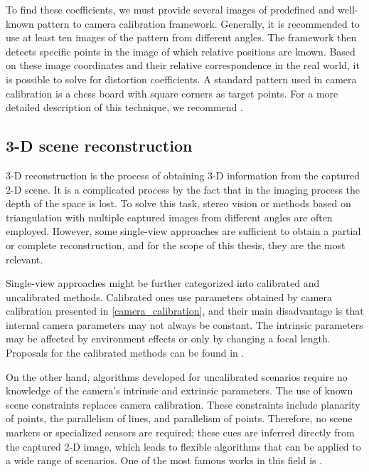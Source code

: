         To find these coefficients, we must provide several images of predefined and well-known pattern to camera calibration framework. Generally, it is recommended to use at least ten images of the pattern from different angles. The framework then detects specific points in the image of which relative positions are known. Based on these image coordinates and their relative correspondence in the real world, it is possible to solve for distortion coefficients. A standard pattern used in camera calibration is a chess board with square corners as target points. For a more detailed description of this technique, we recommend \cite{zhang1999flexible}.

    \subsection{3-D scene reconstruction}
        3-D reconstruction is the process of obtaining 3-D information from the captured 2-D scene. It is a complicated process by the fact that in the imaging process the depth of the space is lost. To solve this task, stereo vision or methods based on triangulation with multiple captured images from different angles are often employed. However, some single-view approaches are sufficient to obtain a partial or complete reconstruction, and for the scope of this thesis, they are the most relevant.
        
        Single-view approaches might be further categorized into calibrated and uncalibrated methods. Calibrated ones use parameters obtained by camera calibration presented in \ref{camera_calibration}, and their main disadvantage is that internal camera parameters may not always be constant. The intrinsic parameters may be affected by environment effects or only by changing a focal length. Proposals for the calibrated methods can be found in \cite{orteu1997camera, wilczkowiak2001camera, kushal2002simple}.
        
        On the other hand, algorithms developed for uncalibrated scenarios require no knowledge of the camera's intrinsic and extrinsic parameters. The use of known scene constraints replaces camera calibration. These constraints include planarity of points, the parallelism of lines, and parallelism of points. Therefore, no scene markers or specialized sensors are required; these cues are inferred directly from the captured 2-D image, which leads to flexible algorithms that can be applied to a wide range of scenarios. One of the most famous works in this field is \cite{criminisi2012accurate}.

